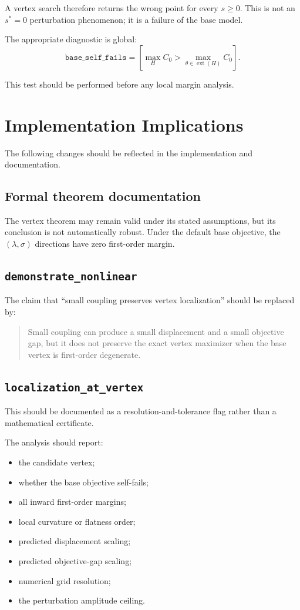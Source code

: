 \documentclass[11pt]{article}
\theoremstyle{remark}
\DeclareMathOperator{\ext}{ext}
\begin{document}
A vertex search therefore returns the wrong point for every $s\geq0$. This is
not an $s^*=0$ perturbation phenomenon; it is a failure of the base model.

The appropriate diagnostic is global:
\[
\texttt{base\_self\_fails}
=
\left[
\max_H C_0
>
\max_{\theta\in\ext(H)}C_0
\right].
\]

This test should be performed before any local margin analysis.

\section{Implementation Implications}

The following changes should be reflected in the implementation and
documentation.

\subsection{Formal theorem documentation}

The vertex theorem may remain valid under its stated assumptions, but its
conclusion is not automatically robust. Under the default base objective, the
$(\lambda,\sigma)$ directions have zero first-order margin.

\subsection{\texttt{demonstrate\_nonlinear}}

The claim that ``small coupling preserves vertex localization'' should be
replaced by:

\begin{quote}
Small coupling can produce a small displacement and a small objective gap, but
it does not preserve the exact vertex maximizer when the base vertex is
first-order degenerate.
\end{quote}

\subsection{\texttt{localization\_at\_vertex}}

This should be documented as a resolution-and-tolerance flag rather than a
mathematical certificate.

The analysis should report:

\begin{itemize}
    \item the candidate vertex;
    \item whether the base objective self-fails;
    \item all inward first-order margins;
    \item local curvature or flatness order;
    \item predicted displacement scaling;
    \item predicted objective-gap scaling;
    \item numerical grid resolution;
    \item the perturbation amplitude ceiling.
\end{itemize}
\end{document}
